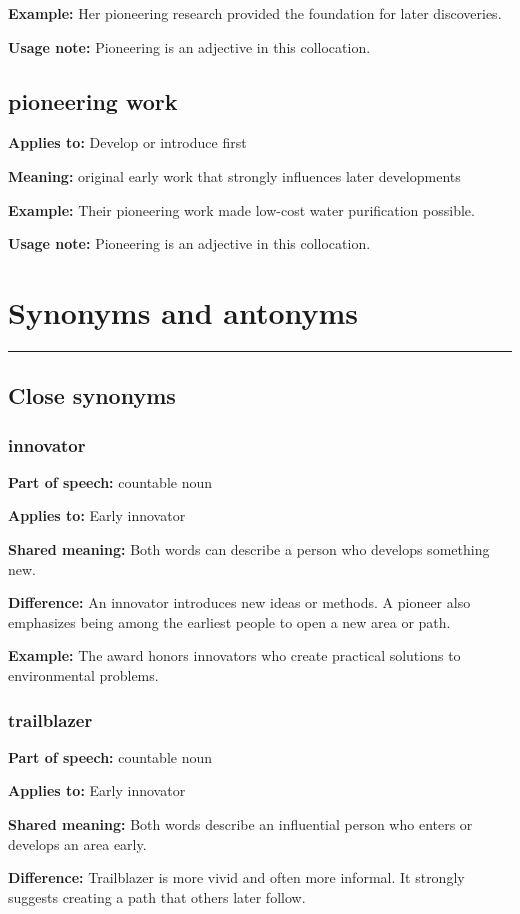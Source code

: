 \documentclass[11pt]{article}
\newcommand{\sectionrule}{\par\vspace{-0.5em}\noindent\textcolor{Accent}{\rule{\linewidth}{0.6pt}}\par}
\begin{document}
\textbf{Example:} Her pioneering research provided the foundation for later discoveries.

\textbf{Usage note:} Pioneering is an adjective in this collocation.

\subsection{pioneering work}
\textbf{Applies to:} Develop or introduce first

\textbf{Meaning:} original early work that strongly influences later developments

\textbf{Example:} Their pioneering work made low-cost water purification possible.

\textbf{Usage note:} Pioneering is an adjective in this collocation.

\section{Synonyms and antonyms}
\sectionrule
\subsection{Close synonyms}
\subsubsection{innovator}
\textbf{Part of speech:} countable noun

\textbf{Applies to:} Early innovator

\textbf{Shared meaning:} Both words can describe a person who develops something new.

\textbf{Difference:} An innovator introduces new ideas or methods. A pioneer also emphasizes being among the earliest people to open a new area or path.

\textbf{Example:} The award honors innovators who create practical solutions to environmental problems.

\subsubsection{trailblazer}
\textbf{Part of speech:} countable noun

\textbf{Applies to:} Early innovator

\textbf{Shared meaning:} Both words describe an influential person who enters or develops an area early.

\textbf{Difference:} Trailblazer is more vivid and often more informal. It strongly suggests creating a path that others later follow.
\end{document}
